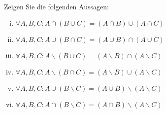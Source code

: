 \newcommand{\printpraesenzlsg}{false}
\newcommand{\printloesungen}{false}
\newcommand{\printbewertungen}{false}
\newcommand{\blattnummer}{3}



\iforiginal{}

	

\\
Zeigen Sie die folgenden Aussagen:
\begin{enumerate}[(i)]
    \item $\forall A,B,C: A\cap (B\cup C)=(A\cap B)\cup(A\cap C)$
    \item $\forall A,B,C: A\cup (B\cap C)=(A\cup B)\cap(A\cup C)$
    \item $\forall A,B,C: A\backslash (B\cup C)=(A\backslash B)\cap(A\backslash C)$
    \item $\forall A,B,C: A\backslash (B\cap C)=(A\backslash B)\cup(A\backslash C)$
    \item $\forall A,B,C: A\cup (B\backslash C)=(A\cup B)\backslash(A\backslash C)$
    \item $\forall A,B,C: A\cap (B\backslash C)=(A\cap B)\backslash(A\backslash C)$
\end{enumerate}


